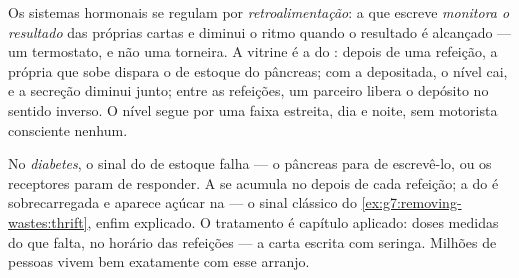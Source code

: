 \begin{proposition}\label{prop:g8:hormonal-communication:feedback}
Os sistemas hormonais se regulam por
\emph{retroalimentação}: a  que
escreve \emph{monitora o resultado} das próprias cartas e diminui o
ritmo quando o resultado é alcançado --- um termostato, e não uma
torneira. A vitrine é a  do : depois de uma refeição, a
própria  que sobe dispara o  de estoque do pâncreas;
com a  depositada, o nível cai, e a secreção diminui junto;
entre as refeições, um  parceiro libera o depósito no sentido
inverso. O nível segue por uma faixa estreita, dia e noite, sem
motorista consciente nenhum.
\end{proposition}
\admitted

\begin{example}\label{ex:g8:hormonal-communication:diabetes}
No \emph{diabetes}, o sinal do  de estoque
falha --- o pâncreas para de escrevê-lo, ou os receptores param de
responder. A  se acumula no  depois de cada refeição; a
 do  é sobrecarregada e aparece açúcar na  --- o
sinal clássico do \cref{ex:g7:removing-wastes:thrift}, enfim
explicado. O tratamento é capítulo aplicado: doses medidas do 
que falta, no horário das refeições --- a carta escrita com seringa.
Milhões de pessoas vivem bem exatamente com esse arranjo.
\end{example}

